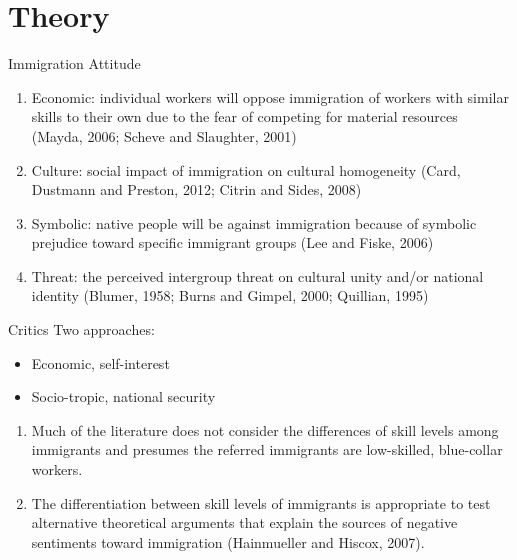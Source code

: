 \documentclass[12pt]{beamer}
\begin{document}
\section{Theory}
\begin{frame}{Immigration Attitude}
\begin{enumerate} 
\item Economic: individual workers will oppose immigration of workers with similar skills to their own due to the fear of competing for material resources (Mayda, 2006; Scheve and Slaughter, 2001)
\item Culture: social impact of immigration on cultural homogeneity (Card, Dustmann and Preston, 2012; Citrin and Sides, 2008)
\item Symbolic: native people will be against immigration because of symbolic prejudice toward specific immigrant groups (Lee and Fiske, 2006)
\item Threat: the perceived intergroup threat on cultural unity and/or national identity  (Blumer, 1958; Burns and Gimpel, 2000; Quillian, 1995)
\end{enumerate}
\end{frame}
\begin{frame}{Critics}
Two approaches:
\begin{itemize}
\item Economic, self-interest
\item Socio-tropic, national security
\end{itemize}

\begin{enumerate}
\item Much of the literature does not consider the differences of skill levels among immigrants and presumes the referred immigrants are low-skilled, blue-collar workers. 
\item The differentiation between skill levels of immigrants is appropriate to test alternative theoretical arguments that explain the sources of negative sentiments toward immigration (Hainmueller and Hiscox, 2007).
\end{enumerate}
 \end{frame}
\end{document}
